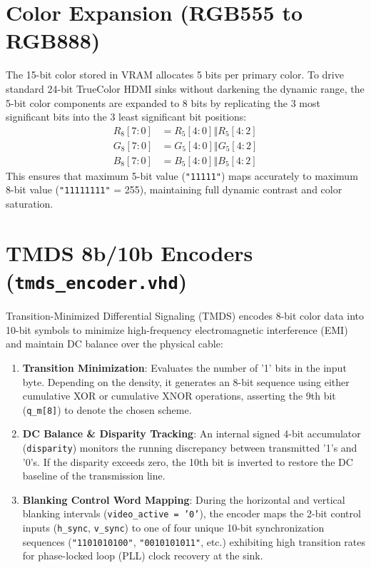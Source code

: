 \section{Color Expansion (RGB555 to RGB888)}
The 15-bit color stored in VRAM allocates 5 bits per primary color. To drive standard 24-bit TrueColor HDMI sinks without darkening the dynamic range, the 5-bit color components are expanded to 8 bits by replicating the 3 most significant bits into the 3 least significant bit positions:
\begin{align}
R_{8}[7:0] &= R_{5}[4:0] \mathbin{\Vert} R_{5}[4:2] \\
G_{8}[7:0] &= G_{5}[4:0] \mathbin{\Vert} G_{5}[4:2] \\
B_{8}[7:0] &= B_{5}[4:0] \mathbin{\Vert} B_{5}[4:2]
\end{align}
This ensures that maximum 5-bit value (\texttt{"11111"}) maps accurately to maximum 8-bit value (\texttt{"11111111"} = 255), maintaining full dynamic contrast and color saturation.

\section{TMDS 8b/10b Encoders (\texttt{tmds\_encoder.vhd})}
Transition-Minimized Differential Signaling (TMDS) encodes 8-bit color data into 10-bit symbols to minimize high-frequency electromagnetic interference (EMI) and maintain DC balance over the physical cable:
\begin{enumerate}
    \item \textbf{Transition Minimization}: Evaluates the number of '1' bits in the input byte. Depending on the density, it generates an 8-bit sequence using either cumulative XOR or cumulative XNOR operations, asserting the 9th bit (\texttt{q\_m[8]}) to denote the chosen scheme.
    \item \textbf{DC Balance \& Disparity Tracking}: An internal signed 4-bit accumulator (\texttt{disparity}) monitors the running discrepancy between transmitted '1's and '0's. If the disparity exceeds zero, the 10th bit is inverted to restore the DC baseline of the transmission line.
    \item \textbf{Blanking Control Word Mapping}: During the horizontal and vertical blanking intervals (\texttt{video\_active = '0'}), the encoder maps the 2-bit control inputs (\texttt{h\_sync}, \texttt{v\_sync}) to one of four unique 10-bit synchronization sequences (\texttt{"1101010100"}, \texttt{"0010101011"}, etc.) exhibiting high transition rates for phase-locked loop (PLL) clock recovery at the sink.
\end{enumerate}

